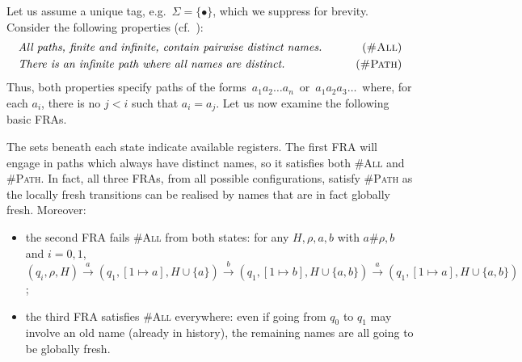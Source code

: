 \begin{example}\label{example:freshPaths}
  Let us assume a unique tag, e.g.\ $\Sigma=\{\bullet\}$, which we suppress for brevity.  
  Consider the following properties (cf.~\cite{KlinHD}):
  \begin{align*}
    &\text{\em All paths, finite and infinite, contain pairwise distinct names.}&\tag{\textsc{\#All}}\\
    &\text{\em There is an infinite path where all names are distinct.}&\tag{\textsc{\#Path}}
\end{align*}
Thus, both properties specify paths of the forms\ $a_1 a_2 \dots a_n$\ or\ $a_1 a_2a_3 \dots$\
where, for each $a_i$, there is no $j < i$ such that $a_i = a_j$. Let us now examine the following basic FRAs.

\noindent
\begin{centering}

\end{centering}
\noindent
The sets beneath each state indicate available registers. The first FRA will engage in paths which always have distinct names, so it satisfies both \textsc{\#All} and \textsc{\#Path}. In fact, all three FRAs, from all possible configurations, satisfy \textsc{\#Path} as the locally fresh transitions can be realised by names that are in fact globally fresh. Moreover:
\begin{itemize}
\item the second FRA fails \textsc{\#All} from both states: for any $H,\rho,a,b$ with $a\#\rho, b$ and $i=0,1$, $(q_i,\rho,H)\xrightarrow{a}(q_1,[1\mapsto a],H\cup\{a\})\xrightarrow{b}(q_1,[1\mapsto b],H\cup\{a,b\})\xrightarrow{a}(q_1,[1\mapsto a],H\cup\{a,b\})$;
\item the third FRA satisfies \textsc{\#All} everywhere: even if going from $q_0$ to $q_1$ may involve an old name (already in history), the remaining names are all going to be globally fresh.
\end{itemize}
\end{example}

